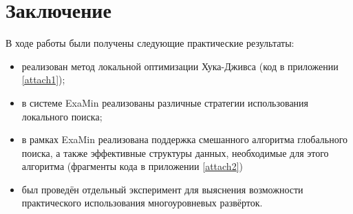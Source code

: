 \section{Заключение}
В ходе работы были получены следующие практические результаты:
\begin{itemize}
  \item реализован метод локальной оптимизации Хука-Дживса (код в приложении \ref{attach1});
  \item в системе ExaMin реализованы различные стратегии использования локального поиска;
  \item в рамках ExaMin реализована поддержка смешанного алгоритма глобального поиска,
  а также эффективные структуры данных, необходимые для этого алгоритма (фрагменты кода в приложении \ref{attach2})
  \item был проведён отдельный эксперимент для выяснения возможности практического использования многоуровневых развёрток.
\end{itemize}
